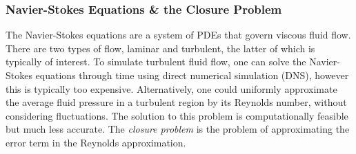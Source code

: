 \documentclass[12pt]{article}
\begin{document}
\subsubsection*{Navier-Stokes Equations \& the Closure Problem}
The Navier-Stokes equations are a system of PDEs that govern
viscous fluid flow. There are two types of flow, laminar and turbulent,
the latter of which is typically of interest. To simulate turbulent fluid
flow, one can solve the Navier-Stokes equations through time using direct
numerical simulation (DNS), however this is typically too expensive.
Alternatively, one could uniformly approximate the average fluid pressure
in a turbulent region by its Reynolds number, without considering
fluctuations. The solution to this problem is computationally feasible but
much less accurate. The {\it closure problem} is the problem of
approximating the error term in the Reynolds approximation.
\end{document}
